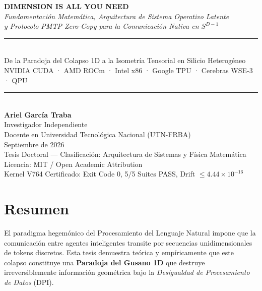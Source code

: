 \documentclass[12pt, a4paper, twoside]{report}
\theoremstyle{definition}
\theoremstyle{remark}
\begin{document}
\begin{titlepage}
  \begin{center}
    \vspace*{1cm}
    {\huge\bfseries\color{polydim-blue} DIMENSION IS ALL YOU NEED}\\[0.8cm]
    {\Large\itshape Fundamentación Matemática, Arquitectura de Sistema Operativo Latente\\
    y Protocolo PMTP Zero-Copy para la Comunicación Nativa en $S^{D-1}$}\\[1.5cm]
    \rule{0.8\textwidth}{1.5pt}\\[0.5cm]
    {\large De la Paradoja del Colapso 1D a la Isometría Tensorial en Silicio Heterogéneo}\\[0.3cm]
    {\normalsize NVIDIA CUDA · AMD ROCm · Intel x86 · Google TPU · Cerebras WSE-3 · QPU}\\[0.5cm]
    \rule{0.8\textwidth}{1.5pt}\\[2cm]
    {\LARGE\bfseries Ariel García Traba}\\[0.3cm]
    {\large Investigador Independiente}\\[0.2cm]
    {\normalsize Docente en Universidad Tecnológica Nacional (UTN-FRBA)}\\[0.5cm]
    {\large Septiembre de 2026}\\[2cm]
    {\normalsize Tesis Doctoral — Clasificación: Arquitectura de Sistemas y Física Matemática}\\[0.3cm]
    {\normalsize Licencia: MIT / Open Academic Attribution}\\[0.3cm]
    {\normalsize Kernel V764 Certificado: Exit Code 0, 5/5 Suites PASS, Drift $\le 4.44 \times 10^{-16}$}
  \end{center}
\end{titlepage}

\chapter*{Resumen}

El paradigma hegemónico del Procesamiento del Lenguaje Natural impone que la comunicación
entre agentes inteligentes transite por secuencias unidimensionales de tokens discretos.
Esta tesis demuestra teórica y empíricamente que este colapso constituye una \textbf{Paradoja
del Gusano 1D} que destruye irreversiblemente información geométrica bajo la
\textit{Desigualdad de Procesamiento de Datos} (DPI).
\end{document}
